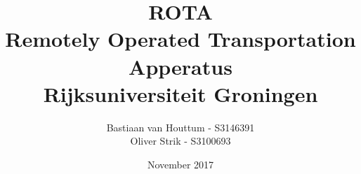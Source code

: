 \documentclass[11pt, a4paper]{article}
\begin{document}
\begin{titlepage}
  \centering
  \title{ROTA \\\large Remotely Operated Transportation Apperatus \\\small \textbf{Rijksuniversiteit Groningen}}
  \author{Bastiaan van Houttum - S3146391 \\ Oliver Strik - S3100693}
  \date{November 2017}
  \maketitle
  \thispagestyle{empty}
\end{titlepage}

\pagebreak\tableofcontents\pagebreak







\end{document}
